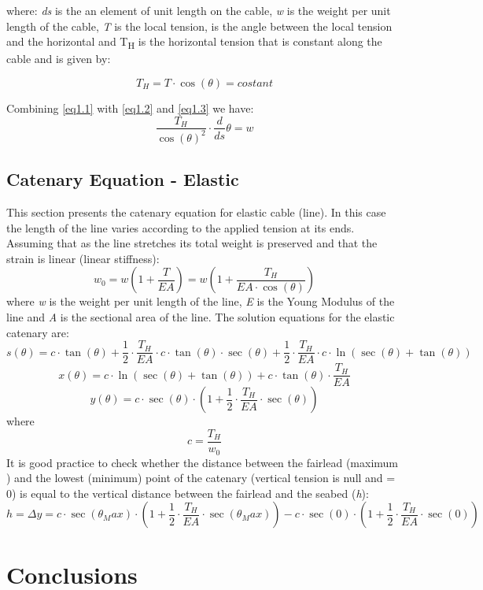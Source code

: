 \documentclass{report}
\begin{document}
	where:
	\textit{ds} is the an element of unit length on the cable, \textit{w} is the weight per unit length of the cable, \textit{T} is the local tension, 
	\texttheta is the angle between the local tension and the horizontal and 
	T\textsubscript{H} is the horizontal tension that is constant along the cable and is given by:
	
	\begin{equation}
	\label{eq1.3}
	T_H = T\cdot\cos(\theta) = costant
	\end{equation}
	
	Combining \ref{eq1.1} with \ref{eq1.2} and \ref{eq1.3} we have:
	\begin{equation}
	\label{eq1.4}
	\frac{T_H}{\cos(\theta)^2}\cdot\frac{d}{ds}\theta = w
	\end{equation}
	
	\section{Catenary Equation - Elastic}
	This section presents the catenary equation for elastic cable (line). In this case the length of the line varies according to the applied tension at its ends.
	Assuming that as the line stretches its total weight is preserved and that the strain is linear (linear stiffness):
	\begin{equation}
	\label{eq1.5}
	w_0 = w\left(1+\frac{T}{EA}\right) = w\left(1+\frac{T_H}{EA\cdot\cos(\theta)}\right)
	\end{equation}
	where \textit{w} is the weight per unit length of the line, \textit{E} is the Young Modulus of the line and \textit{A} is the sectional area of the line.
	The solution equations for the elastic catenary are:
	\begin{equation}
	\label{eq1.6}
	s(\theta) = c\cdot\tan(\theta)+\frac{1}{2}\cdot\frac{T_H}{EA}\cdot c\cdot\tan(\theta)\cdot\sec(\theta)+\frac{1}{2}\cdot\frac{T_H}{EA}\cdot c\cdot\ln\left(\sec(\theta)+\tan(\theta)\right)
	\end{equation}
	\begin{equation}
	\label{eq1.7}
	x(\theta) = c\cdot\ln\left(\sec(\theta)+\tan(\theta)\right)+c\cdot\tan(\theta)\cdot\frac{T_H}{EA}
	\end{equation}
	\begin{equation}
	\label{eq1.8}
	y(\theta) = c\cdot\sec(\theta)\cdot\left(1+\frac{1}{2}\cdot\frac{T_H}{EA}\cdot\sec(\theta)\right)
	\end{equation}
	where
	\begin{equation}
	\label{eq1.9}
	c = \frac{T_H}{w_0}
	\end{equation}
	It is good practice to check whether the distance between the fairlead (maximum \texttheta) and the lowest (minimum) point of the catenary (vertical tension is null and \texttheta = 0) is equal to the vertical distance between the fairlead and the seabed (\textit{h}):
	\begin{equation}
	\label{eq1.10}
	h = \Delta y =  c\cdot\sec(\theta_Max)\cdot\left(1+\frac{1}{2}\cdot\frac{T_H}{EA}\cdot\sec(\theta_Max)\right) - c\cdot\sec(0)\cdot\left(1+\frac{1}{2}\cdot\frac{T_H}{EA}\cdot\sec(0)\right)
	\end{equation}
	
	
	\chapter{Conclusions}
	
\end{document}
